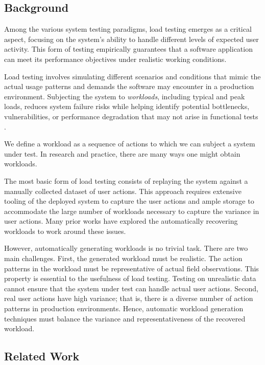 \subsection{Background}

Among the various system testing paradigms, load testing emerges as a critical aspect, focusing on the system's ability to handle different levels of expected user activity. This form of testing empirically guarantees that a software application can meet its performance objectives under realistic working conditions.

Load testing involves simulating different scenarios and conditions that mimic the actual usage patterns and demands the software may encounter in a production environment. Subjecting the system to \emph{workloads}, including typical and peak loads, reduces system failure risks while helping identify potential bottlenecks, vulnerabilities, or performance degradation that may not arise in functional tests \cite{Syer2017-ek, Shang2015-gj, Cohen2005-mn, Hassan2008-nj, Chen2016-bo}.

We define a workload as a sequence of actions to which we can subject a system under test. In research and practice, there are many ways one might obtain workloads.

The most basic form of load testing consists of replaying the system against a manually collected dataset of user actions. This approach requires extensive tooling of the deployed system to capture the user actions and ample storage to accommodate the large number of workloads necessary to capture the variance in user actions. Many prior works have explored the automatically recovering workloads to work around these issues.

However, automatically generating workloads is no trivial task. There are two main challenges. First, the generated workload must be realistic. The action patterns in the workload must be representative of actual field observations. This property is essential to the usefulness of load testing. Testing on unrealistic data cannot ensure that the system under test can handle actual user actions. Second, real user actions have high variance; that is, there is a diverse number of action patterns in production environments. Hence, automatic workload generation techniques must balance the variance and representativeness of the recovered workload.

\subsection{Related Work}

